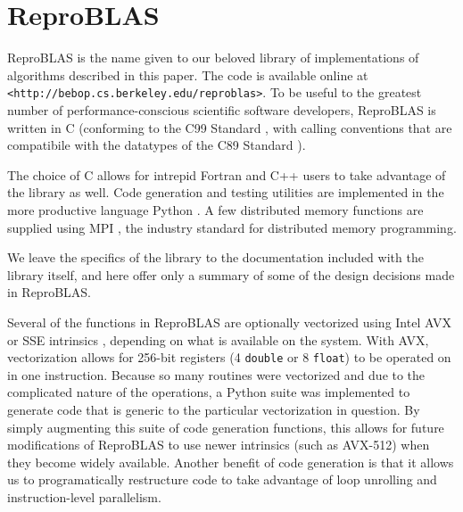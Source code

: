 \section{ReproBLAS}
  \label{sec:reproBLAS}
  ReproBLAS is the name given to our beloved library of implementations of algorithms described in this paper.
  The code is available online at \texttt{<http://bebop.cs.berkeley.edu/reproblas>}.
  To be useful to the greatest number of performance-conscious scientific software developers, ReproBLAS is written in C (conforming to the C99 Standard \cite{c99}, with calling conventions that are compatibile with the datatypes of the C89 Standard \cite{c89}).
\begin{comment}
 complex types \cite{c89} as discussed in \cite{cblasinterface}
Because the C89 standard did not standardize the complex floating point type, all interfaces refer to complex types using \texttt{void*} pointers. If a function would normally return a complex type, a \texttt{void*} pointer is added as the last argument and the function name is suffixed by \texttt{_sub}
\end{comment}
  The choice of C allows for intrepid Fortran and C++ users to take advantage of the library as well.
  Code generation and testing utilities are implemented in the more productive language Python \cite{Python}.
  A few distributed memory functions are supplied using MPI \cite{MPI}, the industry standard for distributed memory programming.

  We leave the specifics of the library to the documentation included with the library itself, and here offer only a summary of some of the design decisions made in ReproBLAS.

  Several of the functions in ReproBLAS are optionally vectorized using Intel AVX or SSE intrinsics \cite{SSEAVX}, depending on what is available on the system. With AVX, vectorization allows for 256-bit registers (4 \texttt{double} or 8 \texttt{float}) to be operated on in one instruction. Because so many routines were vectorized and due to the complicated nature of the operations, a Python suite was implemented to generate code that is generic to the particular vectorization in question. By simply augmenting this suite of code generation functions, this allows for future modifications of ReproBLAS to use newer intrinsics (such as AVX-512) when they become widely available. Another benefit of code generation is that it allows us to programatically restructure code to take advantage of loop unrolling and instruction-level parallelism.

